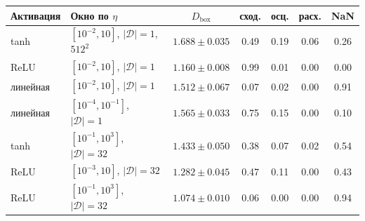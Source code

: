 \begin{tabular}{llccccc}
\toprule
Активация & Окно по $\eta$ & $D_{\mathrm{box}}$ & сход. & осц. & расх. & NaN\\
\midrule
tanh & $[10^{-2},10]$, $|\mathcal{D}|=1$, $512^2$ & $1.688 \pm 0.035$ & 0.49 & 0.19 & 0.06 & 0.26\\
ReLU & $[10^{-2},10]$, $|\mathcal{D}|=1$ & $1.160 \pm 0.008$ & 0.99 & 0.01 & 0.00 & 0.00\\
линейная & $[10^{-2},10]$, $|\mathcal{D}|=1$ & $1.512 \pm 0.067$ & 0.07 & 0.02 & 0.00 & 0.91\\
линейная & $[10^{-4},10^{-1}]$, $|\mathcal{D}|=1$ & $1.565 \pm 0.033$ & 0.75 & 0.15 & 0.00 & 0.10\\
tanh & $[10^{-1},10^{3}]$, $|\mathcal{D}|=32$ & $1.433 \pm 0.050$ & 0.38 & 0.07 & 0.02 & 0.54\\
ReLU & $[10^{-3},10]$, $|\mathcal{D}|=32$ & $1.282 \pm 0.045$ & 0.47 & 0.11 & 0.00 & 0.43\\
ReLU & $[10^{-1},10^{3}]$, $|\mathcal{D}|=32$ & $1.074 \pm 0.010$ & 0.06 & 0.00 & 0.00 & 0.94\\
\bottomrule
\end{tabular}
